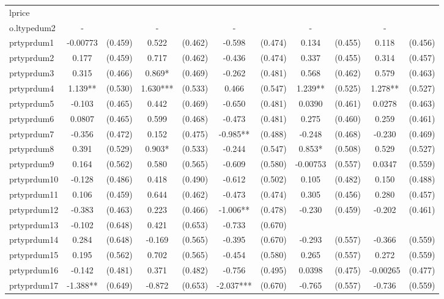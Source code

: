 \documentclass[]{article}
\begin{document}
\begin{tabular}{lcccccccccc}
lprice &  &  &  &  &  &  &  &  &  &  \\
o.ltypedum2 & - &  & - &  & - &  & - &  & - &  \\
prtyprdum1 & -0.00773 & (0.459) & 0.522 & (0.462) & -0.598 & (0.474) & 0.134 & (0.455) & 0.118 & (0.456) \\
prtyprdum2 & 0.177 & (0.459) & 0.717 & (0.462) & -0.436 & (0.474) & 0.337 & (0.455) & 0.314 & (0.457) \\
prtyprdum3 & 0.315 & (0.466) & 0.869* & (0.469) & -0.262 & (0.481) & 0.568 & (0.462) & 0.579 & (0.463) \\
prtyprdum4 & 1.139** & (0.530) & 1.630*** & (0.533) & 0.466 & (0.547) & 1.239** & (0.525) & 1.278** & (0.527) \\
prtyprdum5 & -0.103 & (0.465) & 0.442 & (0.469) & -0.650 & (0.481) & 0.0390 & (0.461) & 0.0278 & (0.463) \\
prtyprdum6 & 0.0807 & (0.465) & 0.599 & (0.468) & -0.473 & (0.481) & 0.275 & (0.460) & 0.259 & (0.461) \\
prtyprdum7 & -0.356 & (0.472) & 0.152 & (0.475) & -0.985** & (0.488) & -0.248 & (0.468) & -0.230 & (0.469) \\
prtyprdum8 & 0.391 & (0.529) & 0.903* & (0.533) & -0.244 & (0.547) & 0.853* & (0.508) & 0.529 & (0.527) \\
prtyprdum9 & 0.164 & (0.562) & 0.580 & (0.565) & -0.609 & (0.580) & -0.00753 & (0.557) & 0.0347 & (0.559) \\
prtyprdum10 & -0.128 & (0.486) & 0.418 & (0.490) & -0.612 & (0.502) & 0.105 & (0.482) & 0.150 & (0.488) \\
prtyprdum11 & 0.106 & (0.459) & 0.644 & (0.462) & -0.473 & (0.474) & 0.305 & (0.456) & 0.280 & (0.457) \\
prtyprdum12 & -0.383 & (0.463) & 0.223 & (0.466) & -1.006** & (0.478) & -0.230 & (0.459) & -0.202 & (0.461) \\
prtyprdum13 & -0.102 & (0.648) & 0.421 & (0.653) & -0.733 & (0.670) &  &  &  &  \\
prtyprdum14 & 0.284 & (0.648) & -0.169 & (0.565) & -0.395 & (0.670) & -0.293 & (0.557) & -0.366 & (0.559) \\
prtyprdum15 & 0.195 & (0.562) & 0.702 & (0.565) & -0.454 & (0.580) & 0.265 & (0.557) & 0.272 & (0.559) \\
prtyprdum16 & -0.142 & (0.481) & 0.371 & (0.482) & -0.756 & (0.495) & 0.0398 & (0.475) & -0.00265 & (0.477) \\
prtyprdum17 & -1.388** & (0.649) & -0.872 & (0.653) & -2.037*** & (0.670) & -0.765 & (0.557) & -0.736 & (0.559) \\

\end{tabular}
\end{document}

